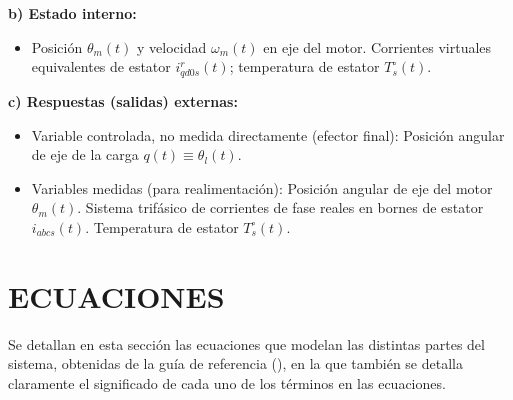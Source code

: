 \documentclass[a4paper, 10pt, onecolumn,journal]{ieeeconf}
\begin{document}
\textbf{b) Estado interno:}
\begin{itemize}
    \item Posición $\theta_m(t)$ y velocidad $\omega_m(t)$ en eje del motor. Corrientes virtuales equivalentes de estator $i_{qd0s}^r(t)$; temperatura de estator $T_s^{\circ}(t)$.
\end{itemize}

\textbf{c) Respuestas (salidas) externas:}
\begin{itemize}
    \item Variable controlada, no medida directamente (efector final): Posición angular de eje de la carga $q(t) \equiv \theta_l(t)$.
    \item Variables medidas (para realimentación): Posición angular de eje del motor $\theta_m(t)$. Sistema trifásico de corrientes de fase reales en bornes de estator $i_{abcs}(t)$. Temperatura de estator $T_s^{\circ}(t)$.
\end{itemize}


\section{ECUACIONES}
Se detallan en esta sección las ecuaciones que modelan las distintas partes del sistema, obtenidas de la guía de referencia (\cite{c1}), en la que también se detalla claramente el significado de cada uno de los términos en las ecuaciones.
\end{document}
